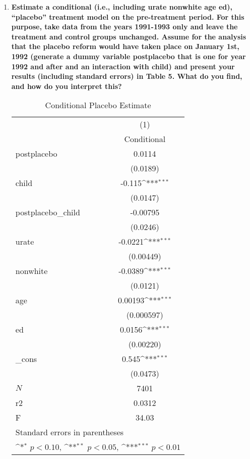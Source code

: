\documentclass{article}
\begin{document}
\begin{enumerate}
\item \textbf{  Estimate a conditional (i.e., including urate nonwhite age ed), “placebo” treatment model on the pre-treatment period. For this purpose, take data from the years 1991-1993 only and leave the treatment and control groups unchanged. Assume for the analysis that the placebo reform would have taken place on January 1st, 1992 (generate a dummy variable postplacebo that is one for year 1992 and after and an interaction with child) and present your results (including standard errors) in Table 5. What do you find, and how do you interpret this? }



\begin{table}[htbp]\centering
	\def\sym#1{\ifmmode^{#1}\else\(^{#1}\)\fi}
	\caption{Conditional Placebo Estimate}
	\begin{tabular}{l*{1}{c}}
		\hline\hline
		&\multicolumn{1}{c}{(1)}\\
		&\multicolumn{1}{c}{Conditional}\\
		\hline
		postplacebo &      0.0114         \\
		&    (0.0189)         \\
		[1em]
		child       &      -0.115\sym{***}\\
		&    (0.0147)         \\
		[1em]
		postplacebo\_child&    -0.00795         \\
		&    (0.0246)         \\
		[1em]
		urate       &     -0.0221\sym{***}\\
		&   (0.00449)         \\
		[1em]
		nonwhite    &     -0.0389\sym{***}\\
		&    (0.0121)         \\
		[1em]
		age         &     0.00193\sym{***}\\
		&  (0.000597)         \\
		[1em]
		ed          &      0.0156\sym{***}\\
		&   (0.00220)         \\
		[1em]
		\_cons      &       0.545\sym{***}\\
		&    (0.0473)         \\
		\hline
		\(N\)       &        7401         \\
		r2          &      0.0312         \\
		F           &       34.03         \\
		\hline\hline
		\multicolumn{2}{l}{\footnotesize Standard errors in parentheses}\\
		\multicolumn{2}{l}{\footnotesize \sym{*} \(p<0.10\), \sym{**} \(p<0.05\), \sym{***} \(p<0.01\)}\\
	\end{tabular}
\end{table}



\end{enumerate}
\end{document}
